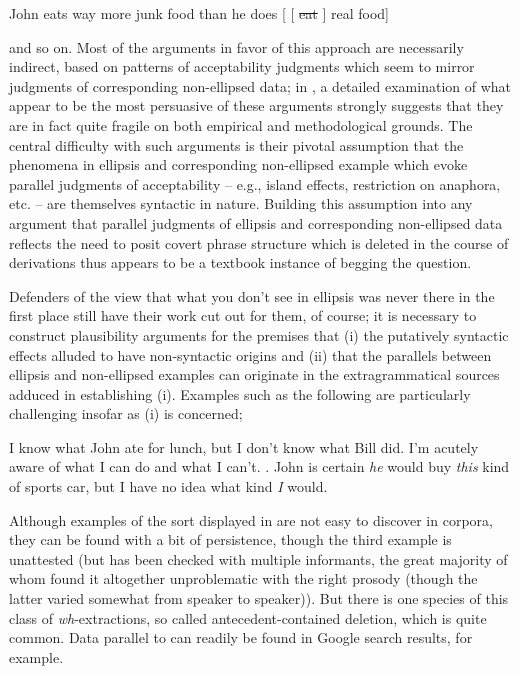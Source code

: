 \documentclass[output=paper,colorlinks,citecolor=brown]{langscibook}
\begin{document}
\begin{exe}
 \ex\label{pseudodeletion}
  John eats way more junk food than he does [ [ \sout{eat} {\gp}\xspace ] real food]
\end{exe}
\begin{sloppypar}
\noindent and so on. Most of the arguments in favor of this approach are
necessarily indirect, based on patterns of acceptability judgments which seem to
mirror judgments of corresponding non\hyp ellipsed data; in \citet{kubotalevineBook}, a
detailed examination of what appear to be the most persuasive of these
arguments strongly suggests that they are in fact quite fragile on
both empirical and methodological grounds. The central difficulty with
such arguments is their pivotal assumption  that
the phenomena in  ellipsis and corresponding non-ellipsed example
which evoke parallel judgments of acceptability -- e.g., island effects,
restriction on anaphora, etc. -- are themselves syntactic in
nature. Building this assumption into any argument that parallel
judgments of ellipsis and corresponding non-ellipsed data reflects the
need to posit covert phrase structure which is deleted in the course
of derivations thus appears to be a textbook instance of begging the question.
\end{sloppypar}

Defenders of the view that what you don't see in ellipsis was never
there in the first place still have their work cut out for them, of
course; it is necessary to construct plausibility arguments for the
premises that (i) the putatively syntactic effects alluded to have
non-syntactic origins and (ii) that the parallels between ellipsis and
non-ellipsed examples can originate in the extragrammatical sources
adduced in establishing (i). Examples such as the following are
particularly challenging insofar as (i) is concerned;


\begin{exe}
 \ex\label{extrac-from-VPE}
  \begin{xlist}
 \ex\label{extrac-from-VPE_a}
    I know what John ate for lunch,  but I don't know what Bill did.
 \ex\label{extrac-from-VPE_b}
    I'm acutely aware of what I can do and what I
  can't. \citep[735]{mahoney2004}.
 \ex\label{extrac-from-VPE_c}
    John is certain \emph{he} would buy \emph{this} kind of sports car, but I have no idea what kind \emph{I} would.
  \end{xlist}
\end{exe}
Although examples of the sort displayed in  are not
easy to discover in corpora, they can be found with a bit of
persistence, though the third example is unattested (but has been
checked with multiple informants, the great majority of whom found it
altogether unproblematic with the right prosody (though the latter
varied somewhat from speaker to speaker)). But there is one species of this class of
\textit{wh}-extractions, so called antecedent-contained deletion,  which is
quite common. Data parallel to  can readily be found in
Google search results, for example.
\end{document}
